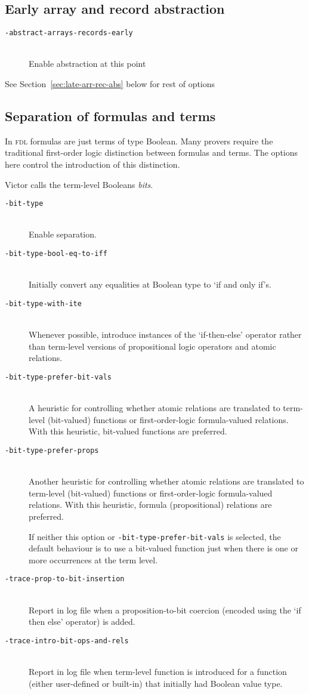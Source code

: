 \documentclass[12pt,fleqn]{article}
\newcommand{\fdl}{\textsc{fdl}}
\newcommand{\optionb}[1]{\item[\texttt{-{#1}}]\ \\}
\begin{document}
\subsection{Early array and record abstraction}

\begin{description}
\optionb{abstract-arrays-records-early} Enable abstraction at this point
\end{description}
See Section~\ref{sec:late-arr-rec-abs} below for rest of options

\subsection{Separation of formulas and terms}

In \fdl{} formulas are just terms of type Boolean.   Many provers require
the traditional first-order logic distinction between formulas and terms.
%
The options here control the introduction of this distinction.

Victor calls the term-level Booleans \emph{bits}.


\begin{description}
\optionb{bit-type} Enable separation.  
\optionb{bit-type-bool-eq-to-iff}
  Initially convert any equalities at Boolean type to `if and only if's.

\optionb{bit-type-with-ite} Whenever possible, introduce instances
  of the `if-then-else' operator rather than term-level versions of
  propositional logic operators and atomic relations.
  
\optionb{bit-type-prefer-bit-vals}
  A heuristic for controlling whether atomic relations are translated
  to term-level (bit-valued) functions or first-order-logic formula-valued
  relations.
  With this heuristic, bit-valued functions are preferred.

\optionb{bit-type-prefer-props}
  Another heuristic for controlling whether atomic relations are translated
  to term-level (bit-valued) functions or first-order-logic formula-valued
  relations.
  With this heuristic, formula (propositional) relations are preferred.

  If neither this option or \texttt{-bit-type-prefer-bit-vals} is selected,
  the default behaviour is to use a bit-valued function just when 
  there is one or more occurrences at the term level.

\optionb{trace-prop-to-bit-insertion}
  Report in log file when a proposition-to-bit coercion (encoded using the
  `if then else' operator) is added.
 
\optionb{trace-intro-bit-ops-and-rels}
  Report in log file when term-level function is introduced for a function
  (either user-defined or built-in) that initially had Boolean value type.

\end{description}
\end{document}
